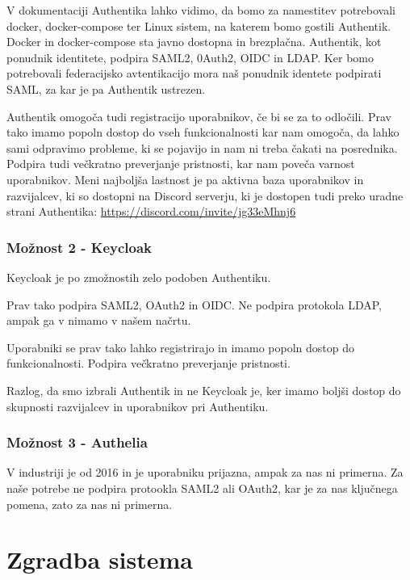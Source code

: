 \documentclass[a4paper,12pt,openright]{book}
\begin{document}
V dokumentaciji Authentika\cite{AuthentikLink} lahko vidimo, da bomo za namestitev potrebovali docker, docker-compose ter Linux sistem, na katerem bomo gostili Authentik. Docker in docker-compose sta javno dostopna in brezplačna. 
\newline    
Authentik, kot ponudnik identitete, podpira SAML2, 0Auth2, OIDC in LDAP. Ker bomo potrebovali federacijsko avtentikacijo mora naš ponudnik identete podpirati SAML, za kar je pa Authentik ustrezen. 

Authentik omogoča tudi registracijo uporabnikov, če bi se za to odločili. Prav tako imamo popoln dostop do vseh funkcionalnosti kar nam omogoča, da lahko sami odpravimo probleme, ki se pojavijo in nam ni treba čakati na posrednika. Podpira tudi večkratno preverjanje pristnosti, kar nam poveča varnost uporabnikov. 
\newline    
Meni najboljša lastnost je pa aktivna baza uporabnikov in razvijalcev, ki so dostopni na Discord serverju, ki je dostopen tudi preko uradne strani Authentika: \url{https://discord.com/invite/jg33eMhnj6}

\subsection{Možnost 2 - Keycloak}

Keycloak je po zmožnostih zelo podoben Authentiku. 

Prav tako podpira SAML2, OAuth2 in OIDC. Ne podpira protokola LDAP, ampak ga v nimamo v našem načrtu. 

\newline
Uporabniki se prav tako lahko registrirajo in imamo popoln dostop do funkcionalnosti. Podpira večkratno preverjanje pristnosti.

Razlog, da smo izbrali Authentik in ne Keycloak je, ker imamo boljši dostop do skupnosti razvijalcev in uporabnikov pri Authentiku.

\subsection{Možnost 3 - Authelia}

V industriji je od 2016 in je uporabniku prijazna, ampak za nas ni primerna. 
\newline
Za naše potrebe ne podpira protookla SAML2 ali OAuth2, kar je za nas ključnega pomena, zato za nas ni primerna. 



\chapter{Zgradba sistema}
\end{document}
